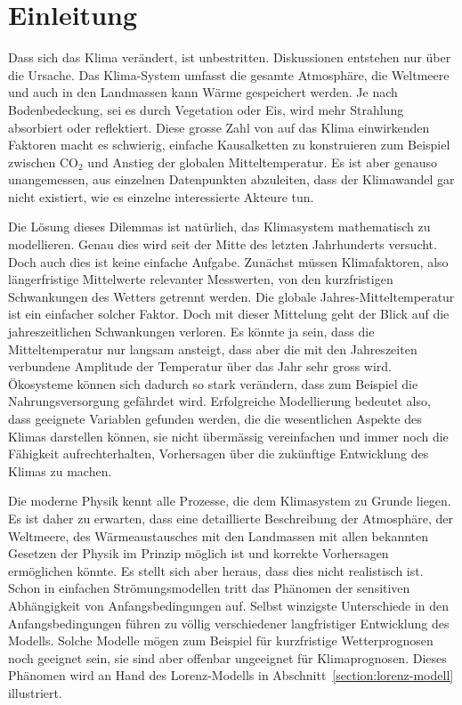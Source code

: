 %
%
%
\chapter*{Einleitung\label{chapter:einleitung}}
Dass sich das Klima verändert, ist unbestritten.
Diskussionen entstehen nur über die Ursache.
Das Klima-System umfasst die gesamte Atmosphäre, die Weltmeere und auch in
den Landmassen kann Wärme gespeichert werden.
Je nach Bodenbedeckung, sei es durch Vegetation oder Eis, wird mehr
Strahlung absorbiert oder reflektiert.
Diese grosse Zahl von auf das Klima einwirkenden Faktoren macht es
schwierig, einfache Kausalketten zu konstruieren zum Beispiel zwischen
$\text{CO}_2$ und Anstieg der globalen Mitteltemperatur.
Es ist aber genauso unangemessen, aus einzelnen Datenpunkten 
abzuleiten, dass der Klimawandel gar nicht existiert, wie es einzelne
interessierte Akteure tun.

Die Lösung dieses Dilemmas ist natürlich, das Klimasystem mathematisch
zu modellieren.
Genau dies wird seit der Mitte des letzten Jahrhunderts versucht.
Doch auch dies ist keine einfache Aufgabe.
Zunächst müssen Klimafaktoren, also längerfristige Mittelwerte
relevanter Messwerten, von den kurzfristigen Schwankungen des
Wetters getrennt werden.
Die globale Jahres-Mitteltemperatur ist ein einfacher solcher Faktor.
Doch mit dieser Mittelung geht der Blick auf die jahreszeitlichen
Schwankungen verloren. 
Es könnte ja sein, dass die Mitteltemperatur nur langsam ansteigt, dass aber die
mit den Jahreszeiten verbundene Amplitude der Temperatur über das Jahr
sehr gross wird.
Ökosysteme können sich dadurch so stark verändern, dass zum
Beispiel die Nahrungsversorgung gefährdet wird.
Erfolgreiche Modellierung bedeutet also, dass geeignete Variablen 
gefunden werden, die die wesentlichen Aspekte des Klimas darstellen
können, sie nicht übermässig vereinfachen und immer noch die Fähigkeit
aufrechterhalten, Vorhersagen über die zukünftige Entwicklung des Klimas 
zu machen.

Die moderne Physik kennt alle Prozesse, die dem Klimasystem zu Grunde
liegen.
Es ist daher zu erwarten, dass eine detaillierte Beschreibung der Atmosphäre,
der Weltmeere, des Wärmeaustausches mit den Landmassen mit allen bekannten
Gesetzen der Physik im Prinzip möglich ist und korrekte Vorhersagen
ermöglichen könnte.
Es stellt sich aber heraus, dass dies nicht realistisch ist.
Schon in einfachen Strömungsmodellen tritt das Phänomen der sensitiven
Abhängigkeit von Anfangsbedingungen auf.
Selbst winzigste Unterschiede in den Anfangsbedingungen führen zu völlig
verschiedener langfristiger Entwicklung des Modells.
Solche Modelle mögen zum Beispiel für kurzfristige Wetterprognosen
noch geeignet sein, sie sind aber offenbar ungeeignet für Klimaprognosen.
Dieses Phänomen wird an Hand des Lorenz-Modells in
Abschnitt~\ref{section:lorenz-modell} illustriert.

